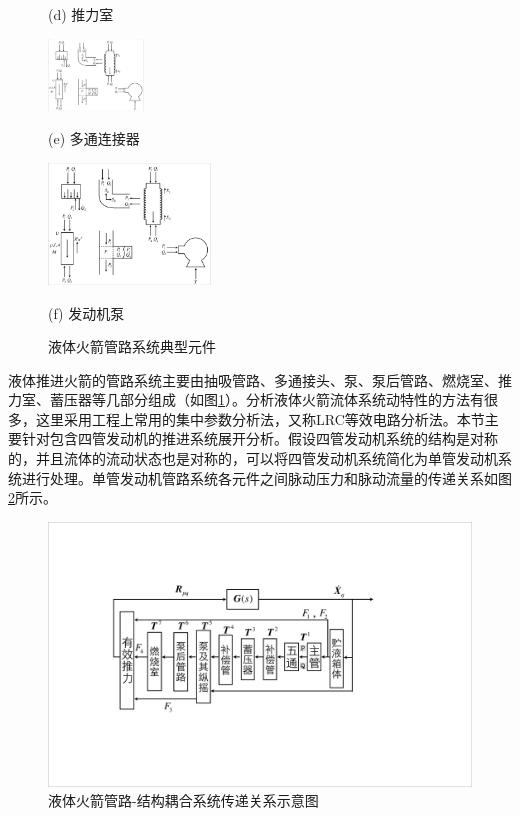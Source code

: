\begin{figure}[!htb]
\begin{minipage}[b]{0.3\textwidth}
		\caption*{(d) 推力室}
	\end{minipage}
	\centering
	\begin{minipage}[b]{0.3\textwidth}
		\centering
		\includegraphics[width=1in]{Multiplex.pdf}
		\caption*{(e) 多通连接器}
	\end{minipage}
	\centering
	\begin{minipage}[b]{0.3\textwidth}
		\centering
		\includegraphics[width=1.7in]{Pump.pdf}
		\caption*{(f) 发动机泵}
	\end{minipage}
	\caption{液体火箭管路系统典型元件}
	\label{FeedLine-TypicalElement}
\end{figure}

液体推进火箭的管路系统主要由抽吸管路、多通接头、泵、泵后管路、燃烧室、推力室、蓄压器等几部分组成（如图\ref{FeedLine-TypicalElement}）。分析液体火箭流体系统动特性的方法有很多，这里采用工程上常用的集中参数分析法，又称LRC等效电路分析法\cite{Dimaggio:1972, Vaage:1972, YangMing:2010}。本节主要针对包含四管发动机的推进系统展开分析。假设四管发动机系统的结构是对称的，并且流体的流动状态也是对称的，可以将四管发动机系统简化为单管发动机系统进行处理。单管发动机管路系统各元件之间脉动压力和脉动流量的传递关系如图\ref{POGO-PipeLine}所示。

\begin{figure}[!htb]
  \centering
  \includegraphics[width=.9\linewidth]{PipeLines.pdf}
  \caption{液体火箭管路-结构耦合系统传递关系示意图}\label{POGO-PipeLine}
\end{figure}

